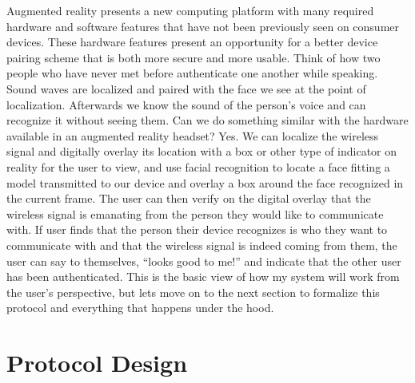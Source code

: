 \documentclass[12pt]{report}
\begin{document}
Augmented reality presents a new computing platform with many required hardware and software features that have not been previously seen on consumer devices. These hardware features present an opportunity for a better device pairing scheme that is both more secure and more usable. Think of how two people who have never met before authenticate one another while speaking. Sound waves are localized and paired with the face we see at the point of localization. Afterwards we know the sound of the person's voice and can recognize it without seeing them. Can we do something similar with the hardware available in an augmented reality headset? Yes. We can localize the wireless signal and digitally overlay its location with a box or other type of indicator on reality for the user to view, and use facial recognition to locate a face fitting a model transmitted to our device and overlay a box around the face recognized in the current frame. The user can then verify on the digital overlay that the wireless signal is emanating from the person they would like to communicate with. If user finds that the person their device recognizes is who they want to communicate with and that the wireless signal is indeed coming from them, the user can say to themselves, ``looks good to me!'' and indicate that the other user has been authenticated. This is the basic view of how my system will work from the user's perspective, but lets move on to the next section to formalize this protocol and everything that happens under the hood.


\chapter{Protocol Design}
\end{document}
